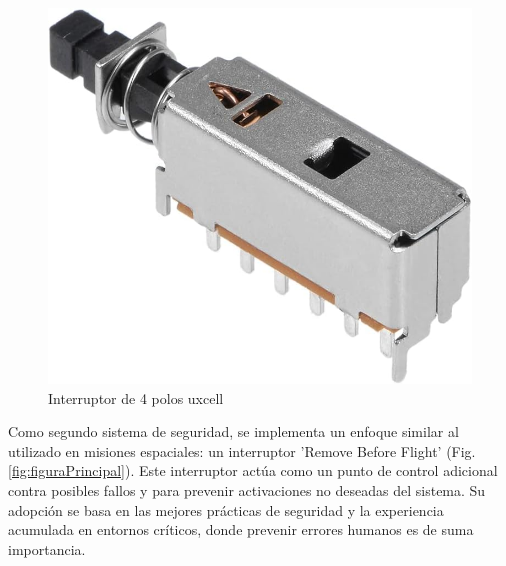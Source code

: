 \begin{figure}[h]
  \centering
  \includegraphics[width=0.3\linewidth]{Pictures/Interruptor.jpg} 
  \caption{Interruptor de 4 polos uxcell}
  \label{fig:4polosinterruptor}
\end{figure}

Como segundo sistema de seguridad, se implementa un enfoque similar al utilizado en misiones espaciales: un interruptor 'Remove Before Flight' (Fig. \ref{fig:figuraPrincipal}). Este interruptor actúa como un punto de control adicional contra posibles fallos y para prevenir activaciones no deseadas del sistema. Su adopción se basa en las mejores prácticas de seguridad y la experiencia acumulada en entornos críticos, donde prevenir errores humanos es de suma importancia.

